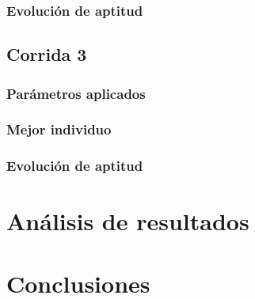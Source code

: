 \documentclass[a4paper,12pt]{article}
\begin{document}
\subsubsection*{Evolución de aptitud}

\subsection{Corrida 3}

\subsubsection*{Parámetros aplicados}

\subsubsection*{Mejor individuo}

\subsubsection*{Evolución de aptitud}

\section{Análisis de resultados}

\section{Conclusiones}

\printbibliography
\end{document}

